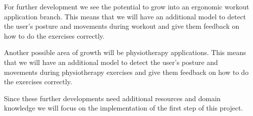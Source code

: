 For further development we see the potential to grow into an ergonomic workout application branch. This means that
we will have an additional model to detect the user's posture and movements during workout and give them feedback on how to do the exercises correctly.

Another possible area of growth will be physiotherapy applications. 
This means that we will have an additional model to detect the user's posture and movements
during physiotherapy exercises and give them feedback on how to do the exercises correctly.

Since these further developments need additional resources and domain knowledge we will focus on the implementation
of the first step of this project. 
